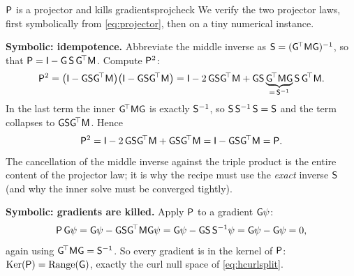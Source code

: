 \begin{workedexample}{$\mathsf{P}$ is a projector and kills gradients}{projcheck}
We verify the two projector laws, first symbolically from \cref{eq:projector},
then on a tiny numerical instance.

\medskip\noindent\textbf{Symbolic: idempotence.}
Abbreviate the middle inverse as $\mathsf{S}=(\mathsf{G}^{\!\top}\mathsf{M}\mathsf{G})^{-1}$,
so that $\mathsf{P}=\mathsf{I}-\mathsf{G}\,\mathsf{S}\,\mathsf{G}^{\!\top}\mathsf{M}$. Compute
$\mathsf{P}^2$:
\[
  \mathsf{P}^2 = \bigl(\mathsf{I}-\mathsf{G}\mathsf{S}\mathsf{G}^{\!\top}\mathsf{M}\bigr)
              \bigl(\mathsf{I}-\mathsf{G}\mathsf{S}\mathsf{G}^{\!\top}\mathsf{M}\bigr)
            = \mathsf{I} - 2\,\mathsf{G}\mathsf{S}\mathsf{G}^{\!\top}\mathsf{M}
              + \mathsf{G}\mathsf{S}\underbrace{\mathsf{G}^{\!\top}\mathsf{M}\mathsf{G}}_{=\,\mathsf{S}^{-1}}\mathsf{S}\,\mathsf{G}^{\!\top}\mathsf{M}.
\]
In the last term the inner $\mathsf{G}^{\!\top}\mathsf{M}\mathsf{G}$ is exactly
$\mathsf{S}^{-1}$, so $\mathsf{S}\,\mathsf{S}^{-1}\,\mathsf{S}=\mathsf{S}$ and the term collapses
to $\mathsf{G}\mathsf{S}\mathsf{G}^{\!\top}\mathsf{M}$. Hence
\[
  \mathsf{P}^2 = \mathsf{I} - 2\,\mathsf{G}\mathsf{S}\mathsf{G}^{\!\top}\mathsf{M}
              + \mathsf{G}\mathsf{S}\mathsf{G}^{\!\top}\mathsf{M}
            = \mathsf{I} - \mathsf{G}\mathsf{S}\mathsf{G}^{\!\top}\mathsf{M} = \mathsf{P}.
\]
The cancellation of the middle inverse against the triple product is the entire
content of the projector law; it is why the recipe must use the \emph{exact}
inverse $\mathsf{S}$ (and why the inner solve must be converged tightly).

\medskip\noindent\textbf{Symbolic: gradients are killed.}
Apply $\mathsf{P}$ to a gradient $\mathsf{G}\psi$:
\[
  \mathsf{P}\,\mathsf{G}\psi
  = \mathsf{G}\psi - \mathsf{G}\mathsf{S}\mathsf{G}^{\!\top}\mathsf{M}\mathsf{G}\psi
  = \mathsf{G}\psi - \mathsf{G}\mathsf{S}\,\mathsf{S}^{-1}\psi
  = \mathsf{G}\psi - \mathsf{G}\psi = 0,
\]
again using $\mathsf{G}^{\!\top}\mathsf{M}\mathsf{G}=\mathsf{S}^{-1}$. So every gradient is in
the kernel of $\mathsf{P}$: $\mathrm{Ker}(\mathsf{P})=\mathrm{Range}(\mathsf{G})$, exactly
the curl null space of \cref{eq:hcurlsplit}.


\end{workedexample}
